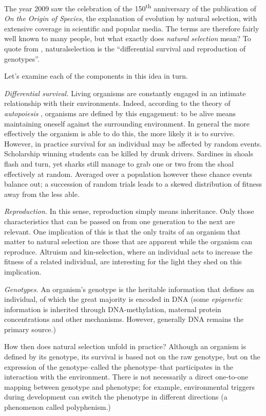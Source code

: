 The year 2009 saw the celebration of the 150\textsuperscript{th} anniversary of the publication of \emph{On the Origin of Species}, the explanation of evolution by natural selection, with extensive coverage in scientific and popular media. The terms are therefore fairly well known to many people, but what exactly does \emph{natural selection} mean? To quote from \textcite{Futuyama:1979tg}, \gls{naturalselection} is the ``differential survival and reproduction of genotypes''.

Let's examine each of the components in this idea in turn.

\emph{Differential survival.} Living organisms are constantly engaged in an intimate relationship with their environments. Indeed, according to the theory of \emph{autopoiesis} \parencite{Varela:1974qd}, organisms are defined by this engagement: to be alive means maintaining oneself against the surrounding environment. In general the more effectively the organism is able to do this, the more likely it is to survive. However, in practice survival for an individual may be affected by random events. Scholarship winning students can be killed by drunk drivers. Sardines in shoals flash and turn, yet sharks still manage to grab one or two from the shoal effectively at random. Averaged over a population however these chance events balance out; a succession of random trials leads to a skewed distribution of fitness away from the less able.

\emph{Reproduction.} In this sense, reproduction simply means inheritance. Only those characteristics that can be passed on from one generation to the next are relevant. One implication of this is that the only traits of an organism that matter to natural selection are those that are apparent while the organism can reproduce. Altruism and kin-selection, where an individual acts to increase the fitness of a related individual, are interesting for the light they shed on this implication.

\emph{Genotypes.} An organism's \gls{genotype} is the heritable information that defines an individual, of which the great majority is encoded in DNA (some \emph{epigenetic} information is inherited through DNA-methylation, maternal protein concentrations and other mechanisms. However, generally DNA remains the primary source.)

How then does natural selection unfold in practice? Although an organism is defined by its genotype, its survival is based not on the raw genotype, but on the expression of the genotype--called the \gls{phenotype}--that participates in the interaction with the environment. There is not necessarily a direct one-to-one mapping between genotype and phenotype; for example, environmental triggers during development can switch the phenotype in different directions (a phenomenon called \gls{polyphenism}.)

